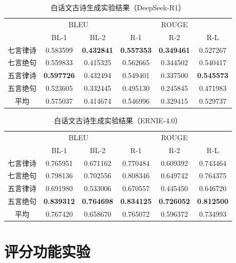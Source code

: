 \begin{table}[ht]
  \centering
  \caption{白话文古诗生成实验结果（DeepSeek-R1）}
  \label{tab:test_generation_tssbs_dsr1}
  \begin{tabular}{cccccc}
      \toprule
      & \multicolumn{2}{c}{BLEU} & \multicolumn{3}{c}{ROUGE} \\
      \cmidrule(r){2-3} \cmidrule(l){4-6}
      & BL-1& BL-2& R-1& R-2& R-L\\
      \midrule
      七言律诗& 0.583599&\bf{0.432841}&\bf{0.557353}&\bf{0.349461}&0.527267\\
      七言绝句&0.559833&0.415325&0.562665&0.344502&0.540417\\
      五言律诗&\bf{0.597726}&0.432494&0.549401&0.337500&\bf{0.545573}\\
      五言绝句&0.523605&0.332445&0.495130&0.245845&0.471983\\
      \cmidrule{2-6} %
      平均&0.575037&0.414674&0.546996&0.329415&0.529737\\
      \bottomrule
  \end{tabular}
\end{table}

\begin{table}[ht]
  \centering
  \caption{白话文古诗生成实验结果（ERNIE-4.0）}
  \label{tab:test_generation_tssbs_ernie4}
  \begin{tabular}{cccccc}
      \toprule
      & \multicolumn{2}{c}{BLEU} & \multicolumn{3}{c}{ROUGE} \\
      \cmidrule(r){2-3} \cmidrule(l){4-6}
      & BL-1& BL-2& R-1& R-2& R-L\\
      \midrule
      七言律诗&0.765951&0.671162&0.770484&0.609392&0.743464\\
      七言绝句&0.798136&0.702556&0.808346&0.649742&0.764375\\
      五言律诗&0.691980&0.533006&0.670557&0.445450&0.646720\\
      五言绝句&\bf{0.839312}&\bf{0.764698}&\bf{0.834125}&\bf{0.726052}&\bf{0.812500}\\
      \cmidrule{2-6} %
      平均&0.767420&0.658670&0.765072&0.596372&0.734993\\
      \bottomrule
  \end{tabular}
\end{table}


\section{评分功能实验} \label{sec:experiment_scoring}

